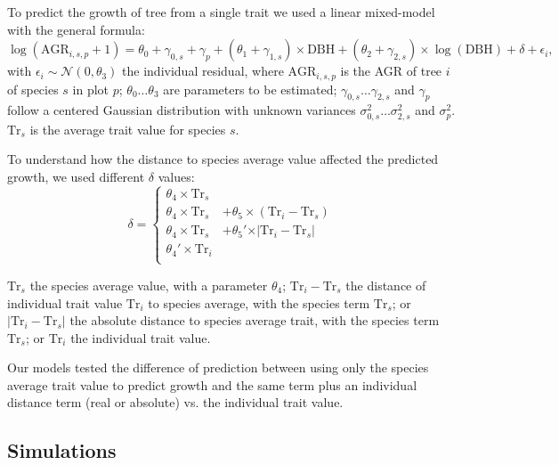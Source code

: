 To predict the growth of tree from a single trait we used a linear mixed-model with the general formula:
\begin{equation}
	\label{eq:growth_mod}
	\log(\text{AGR}_{i, s, p} + 1) = \theta_0 + \gamma_{0, s} + \gamma_p
		+ (\theta_1 + \gamma_{1, s}) \times \text{DBH}
		+ (\theta_2 + \gamma_{2, s}) \times \log(\text{DBH})
		+ \delta
		+ \epsilon_i,
\end{equation}
with $\epsilon_i \sim \mathcal{N}(0, \theta_3)$ the individual residual,
where $\text{AGR}_{i, s, p}$ is the AGR of tree $i$ of species $s$ in plot $p$; $\theta_0 \ldots \theta_3$ are parameters to be estimated; $\gamma_{0, s} \ldots \gamma_{2, s}$ and $\gamma_p$ follow a centered Gaussian distribution with unknown variances $\sigma^2_{0, s} \ldots \sigma^2_{2, s}$ and $\sigma^2_p$. $\text{Tr}_s$ is the average trait value for species $s$.

To understand how the distance to species average value affected the predicted growth, we used different $\delta$ values:
\begin{equation}
	\label{eq:delta}
	\delta = \left\{
	\begin{aligned}
	\theta_4 \times \text{Tr}_s& \\
	\theta_4 \times \text{Tr}_s& + \theta_5 \times(\text{Tr}_i - \text{Tr}_s) \\
	\theta_4 \times \text{Tr}_s& + \theta_5' \times \vert \text{Tr}_i - \text{Tr}_s \vert \\
	\theta_4' \times \text{Tr}_i \\
	\end{aligned}
	\right.
\end{equation}

 $\text{Tr}_s$ the species average value, with a parameter $\theta_4$; $\text{Tr}_i - \text{Tr}_s$ the distance of individual trait value $\text{Tr}_i$ to species average, with the species term $\text{Tr}_s$; or $\vert \text{Tr}_i - \text{Tr}_s \vert$ the absolute distance to species average trait, with the species term $\text{Tr}_s$; or $\text{Tr}_i$ the individual trait value.

Our models tested the difference of prediction between using only the species average trait value to predict growth and the same term plus an individual distance term (real or absolute) vs. the individual trait value.

\subsection*{Simulations}

